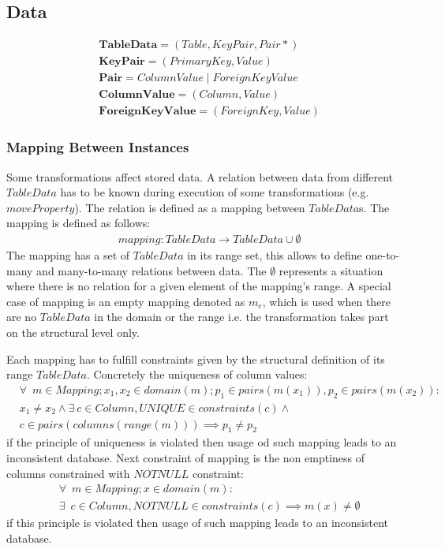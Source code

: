\documentclass[10pt]{article}
\begin{document}
\subsection{Data}
\begin{align}
&	\mathbf{TableData} = (Table, KeyPair, Pair*) \\
&   \mathbf{KeyPair} = (PrimaryKey, Value) \\
&	\mathbf{Pair} = ColumnValue \; | \; ForeignKeyValue \\
&   \mathbf{ColumnValue} = (Column, Value) \\
&   \mathbf{ForeignKeyValue} = (ForeignKey, Value)
\end{align}

\subsubsection{Mapping Between Instances}
Some transformations affect stored data. A relation between data from different $TableData$ has to be known during execution of some transformations (e.g. $moveProperty$). The relation is defined as a mapping between $TableData$s. The mapping is defined as follows:
\begin{align}
& mapping: TableData \rightarrow TableData \cup \emptyset %
\end{align}
The mapping has a set of $TableData$ in its range set, this allows to define one-to-many and many-to-many relations between data. The $\emptyset$ represents a situation where there is no relation for a given element of the mapping's range. A special case of mapping is an empty mapping denoted as $m_e$, which is used when there are no $TableData$ in the domain or the range i.e. the transformation takes part on the structural level only.

Each mapping has to fulfill constraints given by the structural definition of its range $TableData$. Concretely the uniqueness of column values:
\begin{align}
& \forall \: \; m \in Mapping;  x_1, x_2 \in domain(m); p_1 \in pairs(m(x_1)),  p_2 \in pairs(m(x_2)): \nonumber \\ 
&  x_1 \neq x_2 \land \exists \:  c \in Column, UNIQUE \in constraints(c) \land \nonumber \\ 
&c \in pairs(columns(range(m))) \implies  p_1 \neq p_2
\end{align}
if the principle of uniqueness is violated then usage od such mapping leads to an inconsistent database. Next constraint of mapping is the non emptiness of columns constrained with $NOTNULL$ constraint:
\begin{align}
& \forall \: \; m \in Mapping;  x \in domain(m) :  \nonumber \\
& \exists \:  \; c \in Column, NOTNULL \in constraints(c) \implies m(x) \neq \emptyset
\end{align}
if this principle is violated then usage of such mapping leads to an inconsistent database. 
\end{document}
